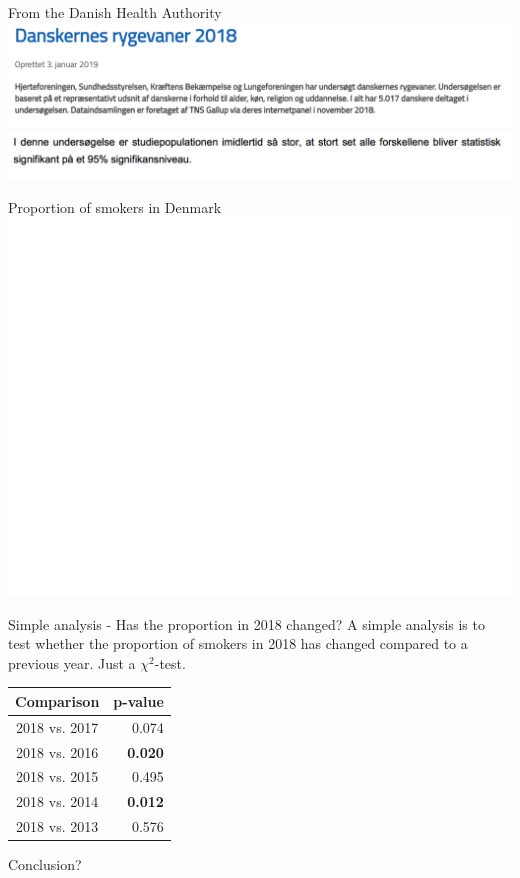 \documentclass[ignorenonframetext,xcolor=pdflatex,table,dvipsnames,serif]{beamer}
\begin{document}
\begin{frame}{From the Danish Health Authority\footnotemark}
\center\includegraphics[scale=0.38]{rygereSST1.png}
\center\includegraphics[scale=0.41]{rygereSST3.png}
\end{frame}


\begin{frame}{Proportion of smokers in Denmark}
\center\includegraphics[scale=0.5]{smokersData}
\end{frame}

\begin{frame}{Simple analysis - Has the proportion in 2018 changed?}
A simple analysis is to test whether the proportion of smokers in 2018 has changed compared to a previous year. Just a $\chi^2$-test.

\begin{table}
\center
\begin{tabular}{c|r|}
Comparison & p-value\\\hline
2018 vs. 2017 & 0.074\\
2018 vs. 2016 & \textbf{0.020}\\
2018 vs. 2015 & 0.495\\
2018 vs. 2014 & \textbf{0.012}\\
2018 vs. 2013 & 0.576\\
\end{tabular}
\end{table}

\vspace{0.5cm}

Conclusion?
\end{frame}
\end{document}
